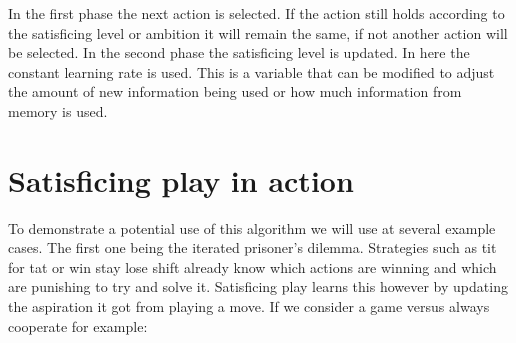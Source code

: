 \toReview In the first phase the next action is selected. If the action still holds
according to the satisficing level or ambition it will remain the same, if not another
action will be selected. In the second phase the satisficing level is updated.
In here the constant learning rate is used. This is a variable that can be
modified to adjust the amount of new information being used or how much
information from memory is used.


\section{Satisficing play in action}
\toReview
To demonstrate a potential use of this algorithm we will use at several example
cases. The first one being the iterated prisoner's dilemma.
\toReview Strategies such as tit for tat or win stay lose shift already know
which actions are winning and which are punishing to try and solve it.
Satisficing play learns this however by updating the aspiration it got from
playing a move. If we consider a game versus always cooperate for example:

